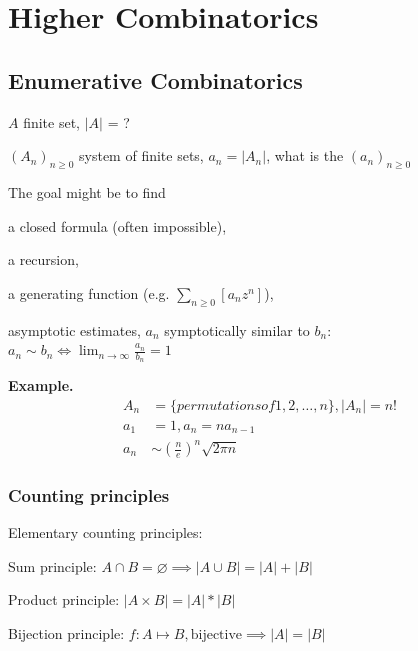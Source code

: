 

\chapter{Higher Combinatorics}

\section{Enumerative Combinatorics}

\strut{}
$A$ finite set, $|A|$ = ?

$(A_n)_{n ≥ 0}$ system of finite sets, $a_n = |A_n|$, what is the  $(a_n)_{n ≥ 0}$

The goal might be to find
\begin{compactitem}
  \item a closed formula (often impossible),
  \item a recursion,
  \item a generating function (e.g. $\sum_{n \geq 0}[a_n z^n]$),
  \item asymptotic estimates, $a_n$ symptotically similar to $b_n$:\\
    $a_n \sim b_n \iff \lim_{n \to \infty} \frac{a_n}{b_n} = 1$
\end{compactitem}


\textbf{Example.}
\begin{align*}
  A_n &= \{permutations of 1,2, \ldots, n\}, |A_n| = n! \\
  a_1 &= 1, a_n = n a_{n-1} \\
  a_n &\sim \left(\frac{n}{e} \right)^n \sqrt{2\pi n}
\end{align*}


\subsection{Counting principles}

Elementary counting principles:
\begin{compactenum}
  \item Sum principle:
    $A\cap B = \varnothing \implies |A\cup B| = |A| + |B|$
  \item Product principle:
    $|A\times B| = |A| * |B|$
  \item Bijection principle:
    $f: A\mapsto B, \text{bijective}\implies |A| = |B|$
\end{compactenum}

